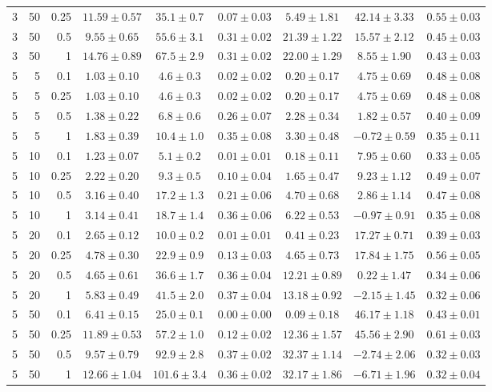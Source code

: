 \begin{table}[htbp]
\begin{tabular}{@{}rrrcccccc@{}}
3 & 50 & 0.25 & $11.59 \pm 0.57$ & $35.1 \pm 0.7$ & $0.07 \pm 0.03$ & $5.49 \pm 1.81$ & $42.14 \pm 3.33$ & $0.55 \pm 0.03$ \\
3 & 50 & 0.5 & $9.55 \pm 0.65$ & $55.6 \pm 3.1$ & $0.31 \pm 0.02$ & $21.39 \pm 1.22$ & $15.57 \pm 2.12$ & $0.45 \pm 0.03$ \\
3 & 50 & 1 & $14.76 \pm 0.89$ & $67.5 \pm 2.9$ & $0.31 \pm 0.02$ & $22.00 \pm 1.29$ & $8.55 \pm 1.90$ & $0.43 \pm 0.03$ \\
\midrule
5 & 5 & 0.1 & $1.03 \pm 0.10$ & $4.6 \pm 0.3$ & $0.02 \pm 0.02$ & $0.20 \pm 0.17$ & $4.75 \pm 0.69$ & $0.48 \pm 0.08$ \\
5 & 5 & 0.25 & $1.03 \pm 0.10$ & $4.6 \pm 0.3$ & $0.02 \pm 0.02$ & $0.20 \pm 0.17$ & $4.75 \pm 0.69$ & $0.48 \pm 0.08$ \\
5 & 5 & 0.5 & $1.38 \pm 0.22$ & $6.8 \pm 0.6$ & $0.26 \pm 0.07$ & $2.28 \pm 0.34$ & $1.82 \pm 0.57$ & $0.40 \pm 0.09$ \\
5 & 5 & 1 & $1.83 \pm 0.39$ & $10.4 \pm 1.0$ & $0.35 \pm 0.08$ & $3.30 \pm 0.48$ & $-0.72 \pm 0.59$ & $0.35 \pm 0.11$ \\
5 & 10 & 0.1 & $1.23 \pm 0.07$ & $5.1 \pm 0.2$ & $0.01 \pm 0.01$ & $0.18 \pm 0.11$ & $7.95 \pm 0.60$ & $0.33 \pm 0.05$ \\
5 & 10 & 0.25 & $2.22 \pm 0.20$ & $9.3 \pm 0.5$ & $0.10 \pm 0.04$ & $1.65 \pm 0.47$ & $9.23 \pm 1.12$ & $0.49 \pm 0.07$ \\
5 & 10 & 0.5 & $3.16 \pm 0.40$ & $17.2 \pm 1.3$ & $0.21 \pm 0.06$ & $4.70 \pm 0.68$ & $2.86 \pm 1.14$ & $0.47 \pm 0.08$ \\
5 & 10 & 1 & $3.14 \pm 0.41$ & $18.7 \pm 1.4$ & $0.36 \pm 0.06$ & $6.22 \pm 0.53$ & $-0.97 \pm 0.91$ & $0.35 \pm 0.08$ \\
5 & 20 & 0.1 & $2.65 \pm 0.12$ & $10.0 \pm 0.2$ & $0.01 \pm 0.01$ & $0.41 \pm 0.23$ & $17.27 \pm 0.71$ & $0.39 \pm 0.03$ \\
5 & 20 & 0.25 & $4.78 \pm 0.30$ & $22.9 \pm 0.9$ & $0.13 \pm 0.03$ & $4.65 \pm 0.73$ & $17.84 \pm 1.75$ & $0.56 \pm 0.05$ \\
5 & 20 & 0.5 & $4.65 \pm 0.61$ & $36.6 \pm 1.7$ & $0.36 \pm 0.04$ & $12.21 \pm 0.89$ & $0.22 \pm 1.47$ & $0.34 \pm 0.06$ \\
5 & 20 & 1 & $5.83 \pm 0.49$ & $41.5 \pm 2.0$ & $0.37 \pm 0.04$ & $13.18 \pm 0.92$ & $-2.15 \pm 1.45$ & $0.32 \pm 0.06$ \\
5 & 50 & 0.1 & $6.41 \pm 0.15$ & $25.0 \pm 0.1$ & $0.00 \pm 0.00$ & $0.09 \pm 0.18$ & $46.17 \pm 1.18$ & $0.43 \pm 0.01$ \\
5 & 50 & 0.25 & $11.89 \pm 0.53$ & $57.2 \pm 1.0$ & $0.12 \pm 0.02$ & $12.36 \pm 1.57$ & $45.56 \pm 2.90$ & $0.61 \pm 0.03$ \\
5 & 50 & 0.5 & $9.57 \pm 0.79$ & $92.9 \pm 2.8$ & $0.37 \pm 0.02$ & $32.37 \pm 1.14$ & $-2.74 \pm 2.06$ & $0.32 \pm 0.03$ \\
5 & 50 & 1 & $12.66 \pm 1.04$ & $101.6 \pm 3.4$ & $0.36 \pm 0.02$ & $32.17 \pm 1.86$ & $-6.71 \pm 1.96$ & $0.32 \pm 0.04$ \\
\bottomrule
\end{tabular}
\end{table}
